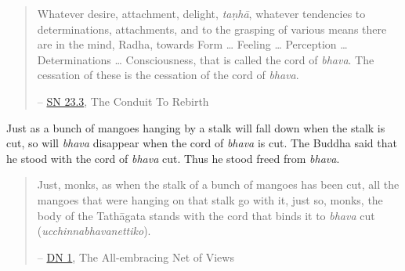 \begin{quote}
Whatever desire, attachment, delight, \textit{taṇhā}, whatever tendencies to determinations, attachments, and to the grasping of various means there are in the mind, Radha, towards Form \ldots{} Feeling \ldots{} Perception \ldots{} Determinations \ldots{} Consciousness, that is called the cord of \textit{bhava}. The cessation of these is the cessation of the cord of \textit{bhava}.

 -- \href{https://suttacentral.net/sn23.3/en/sujato}{SN 23.3}, The Conduit To Rebirth
\end{quote}

Just as a bunch of mangoes hanging by a stalk will fall down when the stalk is cut, so will \textit{bhava} disappear when the cord of \textit{bhava} is cut. The Buddha said that he stood with the cord of \textit{bhava} cut. Thus he stood freed from \textit{bhava}.

\begin{quote}
Just, monks, as when the stalk of a bunch of mangoes has been cut, all the mangoes that were hanging on that stalk go with it, just so, monks, the body of the Tathāgata stands with the cord that binds it to \textit{bhava} cut (\textit{ucchinnabhavanettiko}).

 -- \href{https://suttacentral.net/dn1/en/bodhi}{DN 1}, The All-embracing Net of Views
\end{quote}
